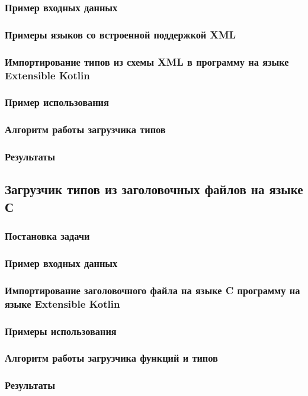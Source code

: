 \documentclass{article}
\begin{document}
\subsubsection{Пример входных данных}
\subsubsection{Примеры языков со встроенной поддержкой XML}
\subsubsection{Импортирование типов из схемы XML в программу на языке Extensible Kotlin}
\subsubsection{Пример использования}
\subsubsection{Алгоритм работы загрузчика типов}
\subsubsection{Результаты}

\subsection{Загрузчик типов из заголовочных файлов на языке С}
\subsubsection{Постановка задачи}
\subsubsection{Пример входных данных}
\subsubsection{Импортирование заголовочного файла на языке C программу на языке Extensible Kotlin}
\subsubsection{Примеры использования}
\subsubsection{Алгоритм работы загрузчика функций и типов}
\subsubsection{Результаты}
\clearpage
\end{document}
